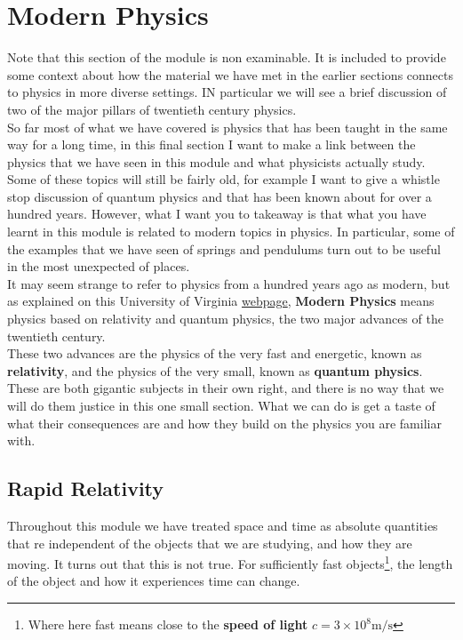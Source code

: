\documentclass[a4paper,12pt]{book}
\begin{document}
\chapter{Modern Physics}
Note that this section of the module is non examinable. It is included to provide some context about how the material we have met in the earlier sections connects to physics in more diverse settings. IN particular we will see a brief discussion of two of the major pillars of twentieth century physics.\\

So far most of what we have covered is physics that has been taught in the same way for a long time, in this final section I want to make a link between the physics that we have seen in this module and what physicists actually study. Some of these topics will still be fairly old, for example I want to give a whistle stop discussion of quantum physics and that has been known about for over a hundred years. However, what I want you to takeaway is that what you have learnt in this module is related to modern topics in physics. In particular, some of the examples that we have seen of springs and pendulums turn out to be useful in the most unexpected of places.\\

It may seem strange to refer to physics from a hundred years ago as modern, but as explained on this University of Virginia \href{https://galileo.phys.virginia.edu/classes/252/home.html}{webpage}, \textbf{Modern Physics} means physics based on relativity and quantum physics, the two major advances of the twentieth century.\\

These two advances are the physics of the very fast and energetic, known as \textbf{relativity}, and the physics of the very small, known as \textbf{quantum physics}. These are both gigantic subjects in their own right, and there is no way that we will do them justice in this one small section. What we can do is get a taste of what their consequences are and how they build on the physics you are familiar with.

\section{Rapid Relativity}
Throughout this module we have treated space and time as absolute quantities that re independent of the objects that we are studying, and how they are moving. It turns out that this is not true. For sufficiently fast objects\footnote{Where here fast means close to the \textbf{speed of light} $c=3\times10^{8}\text{m/s}$}, the length of the object and how it experiences time can change.\\
\end{document}
